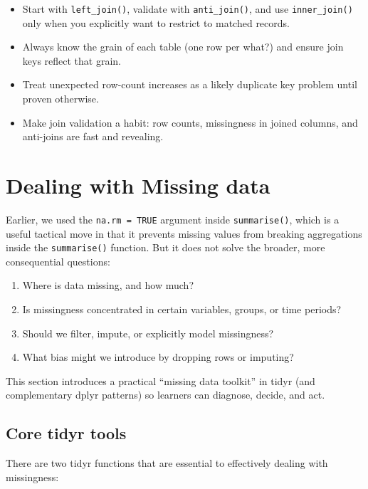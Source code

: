 \documentclass[
  11pt,
]{article}
\providecommand{\tightlist}{%
  \setlength{\itemsep}{0pt}\setlength{\parskip}{0pt}}
\begin{document}
\begin{itemize}
\tightlist
\item
  Start with \texttt{left\_join()}, validate with \texttt{anti\_join()},
  and use \texttt{inner\_join()} only when you explicitly want to
  restrict to matched records.
\item
  Always know the grain of each table (one row per what?) and ensure
  join keys reflect that grain.
\item
  Treat unexpected row-count increases as a likely duplicate key problem
  until proven otherwise.
\item
  Make join validation a habit: row counts, missingness in joined
  columns, and anti-joins are fast and revealing.
\end{itemize}

\section{Dealing with Missing data}\label{dealing-with-missing-data}

Earlier, we used the \texttt{na.rm\ =\ TRUE} argument inside
\texttt{summarise()}, which is a useful tactical move in that it
prevents missing values from breaking aggregations inside the
\texttt{summarise()} function. But it does not solve the broader, more
consequential questions:

\begin{enumerate}
\def\labelenumi{\arabic{enumi}.}
\tightlist
\item
  Where is data missing, and how much?
\item
  Is missingness concentrated in certain variables, groups, or time
  periods?
\item
  Should we filter, impute, or explicitly model missingness?
\item
  What bias might we introduce by dropping rows or imputing?
\end{enumerate}

This section introduces a practical ``missing data toolkit'' in tidyr
(and complementary dplyr patterns) so learners can diagnose, decide, and
act.

\subsection{Core tidyr tools}\label{core-tidyr-tools}

There are two tidyr functions that are essential to effectively dealing
with missingness:
\end{document}

